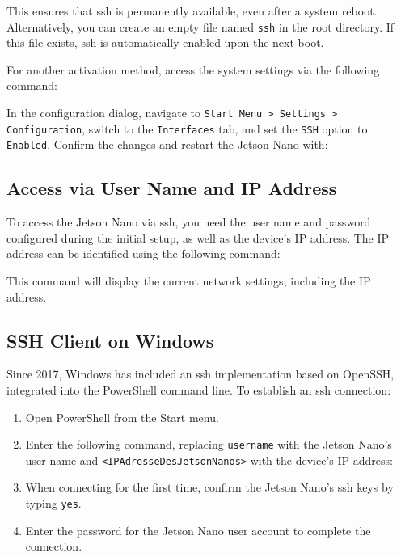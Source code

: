 \medskip


\medskip

This ensures that \ac{ssh} is permanently available, even after a system reboot. Alternatively, you can create an empty file named \texttt{ssh} in the root directory. If this file exists, \ac{ssh} is automatically enabled upon the next boot.

\bigskip

For another activation method, access the system settings via the following command:

\medskip


\medskip

In the configuration dialog, navigate to \texttt{Start Menu > Settings > Configuration}, switch to the \texttt{Interfaces} tab, and set the \texttt{SSH} option to \texttt{Enabled}. Confirm the changes and restart the Jetson Nano with:

\medskip


\subsection{Access via User Name and IP Address}

To access the Jetson Nano via \ac{ssh}, you need the user name and password configured during the initial setup, as well as the device's IP address. The IP address can be identified using the following command:

\medskip


\medskip

This command will display the current network settings, including the IP address.

\subsection{SSH Client on Windows}

Since 2017, Windows has included an \ac{ssh} implementation based on OpenSSH, integrated into the PowerShell command line. To establish an \ac{ssh} connection:

\begin{enumerate}
	\item Open PowerShell from the Start menu.
	\item Enter the following command, replacing \texttt{username} with the Jetson Nano's user name and \texttt{<IPAdresseDesJetsonNanos>} with the device's IP address:
	
	\medskip
	
	
	\medskip
	
	\item When connecting for the first time, confirm the Jetson Nano's \ac{ssh} keys by typing \texttt{yes}.
	\item Enter the password for the Jetson Nano user account to complete the connection.
\end{enumerate}


